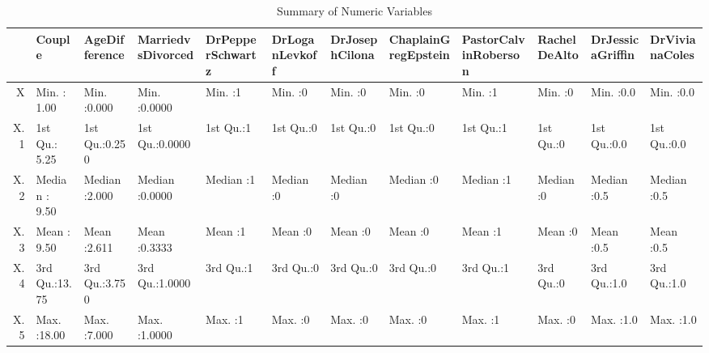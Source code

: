 \begin{table}[ht]
\centering
\begin{tabular}{rlllllllllll}
  \hline
 &     Couple & AgeDifference & MarriedvsDivorced & DrPepperSchwartz & DrLoganLevkoff & DrJosephCilona & ChaplainGregEpstein & PastorCalvinRoberson &  RachelDeAlto & DrJessicaGriffin & DrVivianaColes \\ 
  \hline
X & Min.   : 1.00   & Min.   :0.000   & Min.   :0.0000   & Min.   :1   & Min.   :0   & Min.   :0   & Min.   :0   & Min.   :1   & Min.   :0   & Min.   :0.0   & Min.   :0.0   \\ 
  X.1 & 1st Qu.: 5.25   & 1st Qu.:0.250   & 1st Qu.:0.0000   & 1st Qu.:1   & 1st Qu.:0   & 1st Qu.:0   & 1st Qu.:0   & 1st Qu.:1   & 1st Qu.:0   & 1st Qu.:0.0   & 1st Qu.:0.0   \\ 
  X.2 & Median : 9.50   & Median :2.000   & Median :0.0000   & Median :1   & Median :0   & Median :0   & Median :0   & Median :1   & Median :0   & Median :0.5   & Median :0.5   \\ 
  X.3 & Mean   : 9.50   & Mean   :2.611   & Mean   :0.3333   & Mean   :1   & Mean   :0   & Mean   :0   & Mean   :0   & Mean   :1   & Mean   :0   & Mean   :0.5   & Mean   :0.5   \\ 
  X.4 & 3rd Qu.:13.75   & 3rd Qu.:3.750   & 3rd Qu.:1.0000   & 3rd Qu.:1   & 3rd Qu.:0   & 3rd Qu.:0   & 3rd Qu.:0   & 3rd Qu.:1   & 3rd Qu.:0   & 3rd Qu.:1.0   & 3rd Qu.:1.0   \\ 
  X.5 & Max.   :18.00   & Max.   :7.000   & Max.   :1.0000   & Max.   :1   & Max.   :0   & Max.   :0   & Max.   :0   & Max.   :1   & Max.   :0   & Max.   :1.0   & Max.   :1.0   \\ 
   \hline
\end{tabular}
\caption{Summary of Numeric Variables} 
\label{tab:summary}
\end{table}
